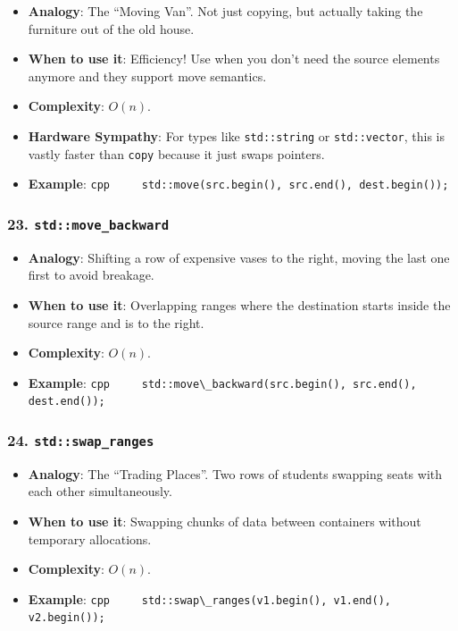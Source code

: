 \begin{itemize}
\tightlist
\item
  \textbf{Analogy}: The ``Moving Van''. Not just copying, but actually
  taking the furniture out of the old house.
\item
  \textbf{When to use it}: Efficiency! Use when you don't need the
  source elements anymore and they support move semantics.
\item
  \textbf{Complexity}: \(O(n)\).
\item
  \textbf{Hardware Sympathy}: For types like
  \passthrough{\lstinline!std::string!} or
  \passthrough{\lstinline!std::vector!}, this is vastly faster than
  \passthrough{\lstinline!copy!} because it just swaps pointers.
\item
  \textbf{Example}:
  \passthrough{\lstinline!cpp     std::move(src.begin(), src.end(), dest.begin());!}
\end{itemize}

\hypertarget{stdmove_backward}{%
\subsubsection{\texorpdfstring{23.
\texttt{std::move\_backward}}{23. std::move\_backward}}\label{stdmove_backward}}

\begin{itemize}
\tightlist
\item
  \textbf{Analogy}: Shifting a row of expensive vases to the right,
  moving the last one first to avoid breakage.
\item
  \textbf{When to use it}: Overlapping ranges where the destination
  starts inside the source range and is to the right.
\item
  \textbf{Complexity}: \(O(n)\).
\item
  \textbf{Example}:
  \passthrough{\lstinline!cpp     std::move\_backward(src.begin(), src.end(), dest.end());!}
\end{itemize}

\hypertarget{stdswap_ranges}{%
\subsubsection{\texorpdfstring{24.
\texttt{std::swap\_ranges}}{24. std::swap\_ranges}}\label{stdswap_ranges}}

\begin{itemize}
\tightlist
\item
  \textbf{Analogy}: The ``Trading Places''. Two rows of students
  swapping seats with each other simultaneously.
\item
  \textbf{When to use it}: Swapping chunks of data between containers
  without temporary allocations.
\item
  \textbf{Complexity}: \(O(n)\).
\item
  \textbf{Example}:
  \passthrough{\lstinline!cpp     std::swap\_ranges(v1.begin(), v1.end(), v2.begin());!}
\end{itemize}

